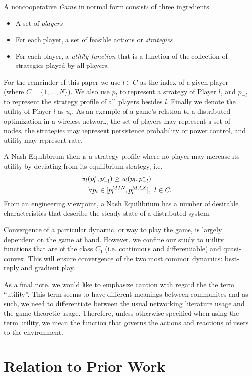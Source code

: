 \documentclass[11pt]{IEEEtran}
\theoremstyle{definition}
\begin{document}
A noncooperative {\em Game} in normal form consists of three ingredients:
\begin{itemize}
	\item A set of {\em players}
	\item For each player, a set of feasible actions or {\em strategies} 
	\item For each player, a {\em utility function} that is a function of the collection of strategies played by all players.
\end{itemize}

For the remainder of this paper we use $l \in C$ as the index of a given player (where $C = \{1,\ldots,N\}$). We also use $p_l$ to represent a strategy of Player $l$, and $p_{-l}$ to represent the strategy profile of all players besides $l$. Finally we denote the utility of Player $l$ as $u_l$. As an example of a game's relation to a distributed optimization in a wireless network, the set of players may represent a set of nodes, the strategies may represent persistence probability or power control, and utility may represent rate.

A Nash Equilibrium then is a strategy profile where no player may increase its utility by deviating from its equilibrium strategy, i.e.
\begin{eqnarray}
	\lefteqn{u_l(p_l^\star,p_{-l}^\star) \geq u_l(p_l,p_{-l}^\star)}\nonumber \\
	& & \forall p_i\in[p_l^{MIN},p_l^{MAX}], \ l \in C.
\end{eqnarray}
From an engineering viewpoint, a Nash Equilibrium has a number of desirable characteristics that describe the steady state of a distributed system.

Convergence of a particular dynamic, or way to play the game, is largely dependent on the game at hand. However, we confine our study to utility functions that are of the class $C_1$ (i.e. continuous and differentiable) and quasi-convex. This will ensure convergence of the two most common dynamics: best-reply and gradient play.

As a final note, we would like to emphasize caution with regard the the term ``utility''. This term seems to have different meanings between communites and as such, we need to differentiate between the usual networking literature usage and the game theoretic usage. Therefore, unless otherwise specified when using the term utility, we mean the function that governs the actions and reactions of users to the environment.


\section{Relation to Prior Work}
\end{document}

